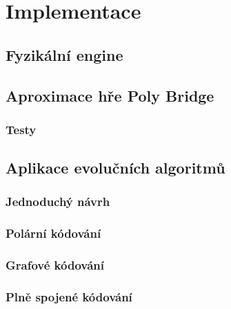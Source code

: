 \chapter{Implementace}

\section{Fyzikální engine}

\section{Aproximace hře Poly Bridge}
\subsection{Testy}

\section{Aplikace evolučních algoritmů}
\subsection{Jednoduchý návrh}
\subsection{Polární kódování}
\subsection{Grafové kódování}
\subsection{Plně spojené kódování}
